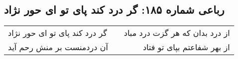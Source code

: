 \begin{center}
\section*{رباعی شماره ۱۸۵: گر درد کند پای تو ای حور نژاد}
\label{sec:sh185}
\begin{longtable}{l p{0.5cm} r}
گر درد کند پای تو ای حور نژاد
&&
از درد بدان که هر گزت درد مباد
\\
آن دردمنست بر منش رحم آید
&&
از بهر شفاعتم بپای تو فتاد
\\
\end{longtable}
\end{center}
